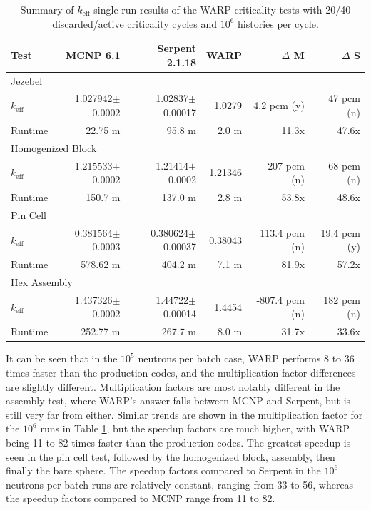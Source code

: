 \begin{table}[h]
\centering
\caption{Summary of $k_\mathrm{eff}$ single-run results of the WARP criticality tests with 20/40 discarded/active criticality cycles and $10^6$ histories per cycle.}
\label{test_summary_6} 
\small
\begin{tabular}{| l | r | r | r | r | r |}
 \hline
 Test & MCNP 6.1 & Serpent 2.1.18 & WARP & $\Delta$ M & $\Delta$ S  \\
\hline
\hline
\multicolumn{6}{|l|}{Jezebel}  \\
\hline
 $k_\mathrm{eff}$ & 1.027942$\pm$0.0002 & 1.02837$\pm$0.00017 & 1.0279 & 4.2 pcm (y) & 47 pcm  (n) \\
 \hline
 Runtime               & 22.75 m & 95.8 m &  2.0 m & 11.3x  & 47.6x  \\
 \hline
 \hline
\multicolumn{6}{|l|}{Homogenized Block }\\
\hline
 $k_\mathrm{eff}$ & 1.215533$\pm$0.0002 & 1.21414$\pm$0.0002 & 1.21346 & 207 pcm (n) &  68 pcm (n)  \\
 \hline
 Runtime               & 150.7 m & 137.0 m & 2.8 m & 53.8x & 48.6x  \\
 \hline
  \hline
\multicolumn{6}{|l|}{Pin Cell}\\
\hline
 $k_\mathrm{eff}$ & 0.381564$\pm$0.0003 & 0.380624$\pm$0.00037 & 0.38043 & 113.4 pcm (n) &  19.4 pcm (y)  \\
 \hline
 Runtime               & 578.62 m & 404.2 m & 7.1 m & 81.9x & 57.2x \\
 \hline
  \hline
\multicolumn{6}{|l|}{Hex Assembly}\\
\hline
 $k_\mathrm{eff}$ & 1.437326$\pm$0.0002 & 1.44722$\pm$0.00014 & 1.4454 & -807.4 pcm (n) &  182 pcm (n) \\
 \hline
 Runtime               & 252.77 m & 267.7 m & 8.0 m & 31.7x & 33.6x \\
 \hline
\end{tabular}
\end{table}

It can be seen that in the $10^5$ neutrons per batch case, WARP performs 8 to 36 times faster than the production codes, and the multiplication factor differences are slightly different.  Multiplication factors are most notably different in the assembly test, where WARP's answer falls between MCNP and Serpent, but is still very far from either.  Similar trends are shown in the multiplication factor for the $10^6$ runs in Table \ref{test_summary_6}, but the speedup factors are much higher, with WARP being 11 to 82 times faster than the production codes.   The greatest speedup is seen in the pin cell test, followed by the homogenized block, assembly, then finally the bare sphere.  The speedup factors compared to Serpent in the $10^6$ neutrons per batch runs are relatively constant, ranging from 33 to 56, whereas the speedup factors compared to MCNP range from 11 to 82.

